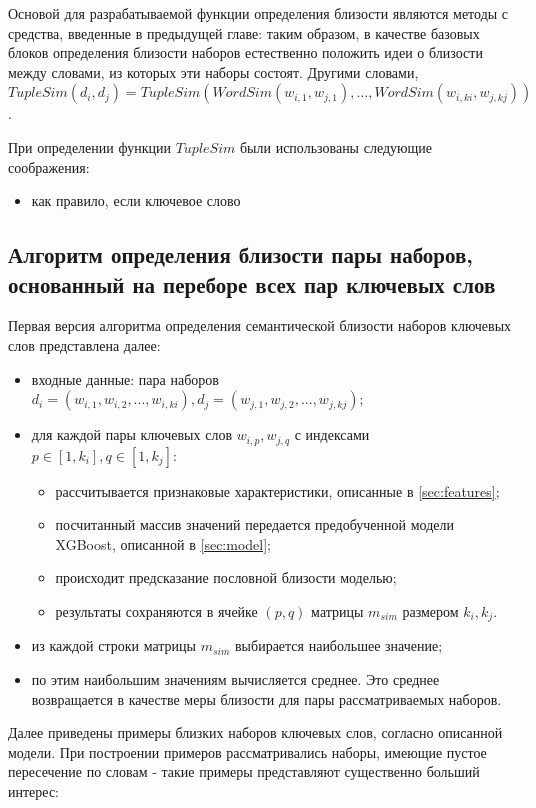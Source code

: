 Основой для разрабатываемой функции определения близости являются методы с средства, введенные в предыдущей главе: таким образом, в качестве базовых  блоков определения близости наборов естественно положить идеи о близости между словами, из которых эти наборы состоят. Другими словами, $TupleSim(d_i, d_j) = TupleSim(WordSim(w_{i,1}, w_{j,1}), ... , WordSim(w_{i,ki}, w_{j,kj}))$. 

При определении функции $TupleSim$ были использованы следующие соображения:
\begin{itemize}
    \item как правило, если ключевое слово
\end{itemize}


\subsection{Алгоритм определения близости пары наборов, основанный на переборе всех пар ключевых слов}
Первая версия алгоритма определения семантической близости наборов ключевых слов представлена далее:
\begin{itemize}
    \item входные данные: пара наборов $d_i = (w_{i,1},w_{i,2},...,w_{i,ki}), d_j = (w_{j,1},w_{j,2},...,w_{j,kj})$;
    \item для каждой пары ключевых слов $w_{i,p}, w_{j,q}$ с индексами $p \in [1, k_i], q \in [1, k_j]$:
        \begin{itemize}
            \item рассчитывается признаковые характеристики, описанные в \ref{sec:features};
            \item посчитанный массив значений передается предобученной модели XGBoost, описанной в \ref{sec:model};
            \item происходит предсказание пословной близости моделью;
            \item результаты сохраняются в ячейке $(p, q)$ матрицы $m_{sim}$ размером $k_i, k_j$.
        \end{itemize}
    \item из каждой строки матрицы $m_{sim}$ выбирается наибольшее значение;
    \item по этим наибольшим значениям вычисляется среднее. Это среднее возвращается в качестве меры близости для пары рассматриваемых наборов.
\end{itemize}

Далее приведены примеры близких наборов ключевых слов, согласно описанной модели. При построении примеров рассматривались наборы, имеющие пустое пересечение по словам - такие примеры представляют существенно больший интерес:

